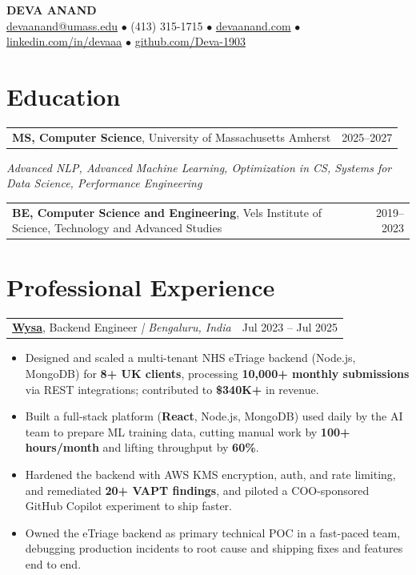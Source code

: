 \documentclass[letterpaper,11pt]{article}
\makeatletter
\newcommand{\eduItem}[3]{%
  \begin{tabular*}{\textwidth}{@{}l@{\extracolsep{\fill}}r@{}}
    \textbf{#1}, #2 & #3 \\
  \end{tabular*}\par
}
\newcommand{\expItem}[4]{%
  \vspace{3pt}
  \begin{tabular*}{\textwidth}{@{}l@{\extracolsep{\fill}}r@{}}
    \textbf{#1}, #2 \textit{| #3} & #4 \\
  \end{tabular*}\par\vspace{-2pt}
}
\makeatother
\begin{document}
\begin{center}
    {\fontsize{18}{20}\selectfont\bfseries DEVA ANAND}\\ \vspace{3pt}
    {\small
    \href{mailto:devaanand@umass.edu}{devaanand@umass.edu}
    \enspace$\bullet$\enspace
    (413) 315-1715
    \enspace$\bullet$\enspace
    \href{https://devaanand.com}{devaanand.com}
    \enspace$\bullet$\enspace
    \href{https://linkedin.com/in/devaaa/}{linkedin.com/in/devaaa}
    \enspace$\bullet$\enspace
    \href{https://github.com/Deva-1903}{github.com/Deva-1903}}
\end{center}
\vspace{-6pt}

\section{Education}
\eduItem{MS, Computer Science}{University of Massachusetts Amherst}{2025--2027}
{\small\textit{Advanced NLP, Advanced Machine Learning, Optimization in CS, Systems for Data Science, Performance Engineering}}\par
\vspace{3pt}
\eduItem{BE, Computer Science and Engineering}{Vels Institute of Science, Technology and Advanced Studies}{2019--2023}

\section{Professional Experience}

\expItem{\href{https://www.wysa.io}{Wysa}}{Backend Engineer}{Bengaluru, India}{Jul 2023 -- Jul 2025}
\begin{itemize}
  \item Designed and scaled a multi-tenant NHS eTriage backend (Node.js, MongoDB) for \textbf{8+ UK clients}, processing \textbf{10{,}000+ monthly submissions} via REST integrations; contributed to \textbf{\$340K+} in revenue.
  \item Built a full-stack platform (\textbf{React}, Node.js, MongoDB) used daily by the AI team to prepare ML training data, cutting manual work by \textbf{100+ hours/month} and lifting throughput by \textbf{60\%}.
  \item Hardened the backend with AWS KMS encryption, auth, and rate limiting, and remediated \textbf{20+ VAPT findings}, and piloted a COO-sponsored GitHub Copilot experiment to ship faster.
  \item Owned the eTriage backend as primary technical POC in a fast-paced team, debugging production incidents to root cause and shipping fixes and features end to end.
\end{itemize}
\end{document}
